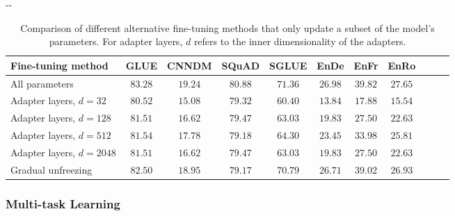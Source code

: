 \documentclass[twoside,11pt]{article}
\newlength{\offsetpage}
\newenvironment{widepage}{\begin{adjustwidth}{-\offsetpage}{-\offsetpage}
    \addtolength{\textwidth}{2\offsetpage}}
{\end{adjustwidth}}
\newcommand{\bsl}{\makebox[0pt][r]{\raisebox{0.05em}{$\bigstar\,$}}}
\def\*#1{\mathbf{#1}}
\begin{document}
\begin{table}
\footnotesize
\begin{widepage}
\centering
\begin{tabular}{l c c c c c c c c c c}
\toprule
    Fine-tuning method       & GLUE        & CNNDM       & SQuAD       & SGLUE       & EnDe        & EnFr        & EnRo    \\
\midrule
    \bsl All parameters      & $\*{83.28}$ & $\*{19.24}$ & $\*{80.88}$ & $\*{71.36}$ & $\*{26.98}$ & $\*{39.82}$ & $\*{27.65}$ \\
    Adapter layers, $d=32$    & $80.52$ & $15.08$ & $79.32$ & $60.40$ & $13.84$ & $17.88$ & $15.54$ \\
    Adapter layers, $d=128$   & $81.51$ & $16.62$ & $79.47$ & $63.03$ & $19.83$ & $27.50$ & $22.63$ \\
    Adapter layers, $d=512$   & $81.54$ & $17.78$ & $79.18$ & $64.30$ & $23.45$ & $33.98$ & $25.81$ \\
    Adapter layers, $d=2048$  & $81.51$ & $16.62$ & $79.47$ & $63.03$ & $19.83$ & $27.50$ & $22.63$ \\
    Gradual unfreezing       & $82.50$ & $18.95$ & $79.17$ & $\*{70.79}$ & $26.71$ & $39.02$ & $26.93$ \\
\bottomrule
\end{tabular}
\end{widepage}
\caption{
Comparison of different alternative fine-tuning methods that only update a subset of the model's parameters.
For adapter layers, $d$ refers to the inner dimensionality of the adapters.
}
\label{tab:finetuning}
\end{table}

\subsubsection{Multi-task Learning}
\label{sec:multitask}
\end{document}
